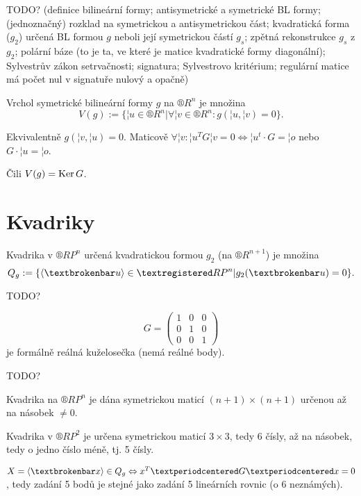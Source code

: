 \documentclass[12pt]{article}					%
\begin{document}

TODO? (definice bilineární formy; antisymetrické a symetrické BL formy; (jednoznačný) rozklad na symetrickou a antisymetrickou část; kvadratická forma ($g_2$) určená BL formou $g$ neboli její symetrickou částí $g_s$; zpětná rekonstrukce $g_s$ z $g_2$; polární báze (to je ta, ve které je matice kvadratické formy diagonální); Sylvestrův zákon setrvačnosti; signatura; Sylvestrovo kritérium; regulární matice má počet nul v signatuře nulový a opačně)

\begin{definice}
	Vrchol symetrické bilineární formy $g$ na $®R^n$ je množina
	$$ V(g) := \{¦u \in ®R^n | \forall ¦v \in ®R^n : g(¦u, ¦v) = 0\}. $$

	\begin{poznamkain}
		Ekvivalentně $g(¦v, ¦u) = 0$. Maticově $\forall ¦v: ¦u^T G ¦v = 0 \Leftrightarrow ¦u^t·G = ¦o$ nebo $G·¦u = ¦o$.

		Čili $V(g) = \operatorname{Ker} G$.
	\end{poznamkain}
\end{definice}

\section{Kvadriky}
\begin{definice}[Kvadrika]
	Kvadrika v $®RP^n$ určená kvadratickou formou $g_2$ (na $®R^{n+1}$) je množina
	$$ Q_g := \{\<¦u\> \in ®RP^n | g_2(¦u) = 0\}. $$
\end{definice}

\begin{priklady}
	TODO?

	$$ G = \begin{pmatrix} 1 & 0 & 0 \\ 0 & 1 & 0 \\ 0 & 0 & 1 \end{pmatrix} $$
	je formálně reálná kuželosečka (nemá reálné body).

	TODO?
\end{priklady}

\begin{dusledek}
	Kvadrika na $®RP^n$ je dána symetrickou maticí $(n+1) \times (n+1)$ určenou až na násobek $≠0$.
\end{dusledek}

\begin{dusledek}
	Kvadrika v $®RP^2$ je určena symetrickou maticí $3\times 3$, tedy 6 čísly, až na násobek, tedy o jedno číslo méně, tj. 5 čísly.

	\begin{dusledekin}
		$X = \<¦x\> \in Q_g \Leftrightarrow x^T·G·x = 0$, tedy zadání 5 bodů je stejné jako zadání 5 lineárních rovnic (o 6 neznámých).
	\end{dusledekin}
\end{dusledek}
\end{document}
